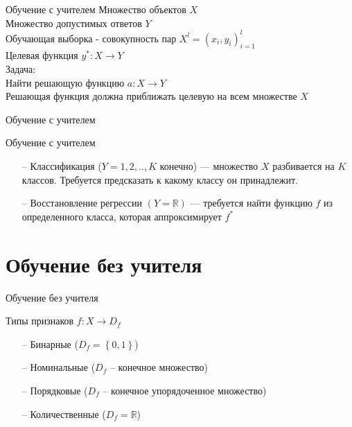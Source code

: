 \documentclass[10pt]{beamer}
\begin{document}
\begin{frame}{Обучение с учителем }
	Множество объектов $X$ \\
	Множество допустимых ответов $Y$\\
	Обучающая выборка - совокупность пар ${X^l = (x_i,y_i)_{i=1}^l}$ \\
	Целевая функция ${y^*:X \rightarrow Y}$\\
	\bigbreak
	\alert{Задача}:\\
	Найти решающую функцию ${a: X \rightarrow Y}$  \\
	Решающая функция должна приближать целевую на всем множестве ${X}$
\end{frame}

\begin{frame}{Обучение с учителем}
\end{frame}

\begin{frame}{Обучение с учителем }
	\begin{itemize}
	  \item[--] Классификация (${Y={1,2,..,K}}$ конечно) — множество $X$ разбивается на $K$ классов. Требуется предсказать к какому классу он принадлежит. 
	  \item[--] Восстановление регрессии ${(Y=\mathbb{R})}$ — требуется найти функцию $f$ из определенного класса, которая аппроксимирует $f^*$
	\end{itemize}
\end{frame}

\section{Обучение без учителя}

\begin{frame}{Обучение без учителя}
\end{frame}

\begin{frame}{Типы признаков}
	${f: X \rightarrow D_f}$
	\begin{itemize}
	  \item[--] Бинарные (${D_f = \left\{ 0, 1 \right\} }$)
	  \item[--] Номинальные (${D_f}$ -- конечное множество)
	  \item[--] Порядковые (${D_f}$ -- конечное упорядоченное множество)
	  \item[--] Количественные (${D_f = \mathbb{R} }$)
	\end{itemize}
\end{frame}
\end{document}
